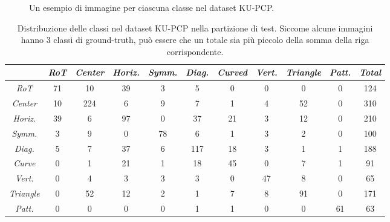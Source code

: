 \begin{figure}[b]
    
    \begin{subfigure}{\textwidth}
        \centering
    \end{subfigure}
    
    
    \caption{Un esempio di immagine per ciascuna classe nel dataset KU-PCP.}
    \label{fig:kupcp_ex}
\end{figure}


    
\begin{table}[ht]
    \centering
    \setlength{\tabcolsep}{4pt} %
    \renewcommand{\arraystretch}{1.6} %
    \begin{tabular}{c|c|c|c|c|c|c|c|c|c|c}
        & \textit{RoT} & \textit{Center} & \textit{Horiz.} & \textit{Symm.} & \textit{Diag.} & \textit{Curved} & \textit{Vert.} & \textit{Triangle} & \textit{Patt.} & \textit{Total} \\
        \hline
        \hline
        \textit{RoT} & 71 & 10 & 39 & 3 & 5 & 0 & 0 & 0 & 0 & 124 \\
        \hline
        \textit{Center} & 10 &224&6&9&7&1&4&52&0&310 \\
        \hline
        \textit{Horiz.}& 39&6&97&0&37&21&3&12&0&210 \\
        \hline
        \textit{Symm.} &3&9&0&78&6&1&3&2&0&100 \\
        \hline
        \textit{Diag.} &5&7&37&6&117&18&3&1&1&188 \\
        \hline
        \textit{Curve}& 0&1&21&1&18&45&0&7&1&91  \\
        \hline
        \textit{Vert.}& 0&4&3&3&3&0&47&8&0&65 \\
        \hline
        \textit{Triangle}& 0&52&12&2&1&7&8&91&0&171 \\
        \hline
        \textit{Patt.}& 0&0&0&0&1&1&0&0&61&63 \\
    
    \end{tabular}
    
    \caption{Distribuzione delle classi nel dataset KU-PCP nella partizione di test. Siccome alcune immagini hanno 3 classi di ground-truth, può essere che un totale sia più piccolo della somma della riga corrispondente.}
    \label{tab:kupcp_comp}
    
\end{table}
\clearpage
